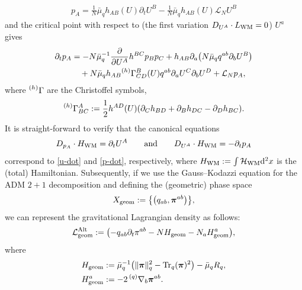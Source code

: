 \documentclass[pdftex]{sigma}
\def\ptl{\partial}%
\def\mbo#1{\boldsymbol{#1}}%
\def\grad{{\nabla}}%
\newcommand{\leftexp}[2]{{\vphantom{#2}}^{#1}{#2}}
\def\halb{\frac{1}{2}}%
\numberwithin{equation}{section}
\begin{document}
\begin{align} \label{u-dot}
p_A = \frac{1}{N} \bar{\mu}_q h_{AB} (U) \ptl_t U^B - \frac{1}{N} \bar{\mu}_q h_{AB} (U) \mathcal{L}_N U^B
\end{align}
and the critical point with respect to \big(the first variation $ D_{U^A} \cdot L_{{\rm WM}}=0$\big) $U^a$ gives
\begin{align}
\ptl_t p_A&{}= -N \bar{\mu}^{-1}_q \frac{\ptl}{\ptl U^A}h^{BC} p_B p_C + h_{AB} \ptl_a\bigl(N \bar{\mu}_q q^{ab} \ptl_b U^B\bigr) \notag\\
&\quad{}+ N\bar{\mu}_q h_{AB} \leftexp{(h)}{\Gamma}^B_{CD}(U)q^{ab}\ptl_a U^C \ptl_b U^D
 + \mathcal{L}_N p_A,\label{p-dot}
\end{align}
where $\leftexp{(h)}{\Gamma}$ are the Christoffel symbols,
\[
\leftexp{(h)}{\Gamma}^A_{BC} := \halb h^{AD}(U) (\ptl_C h_{BD} + \ptl_B h_{DC} - \ptl_D h_{BC}).
\]
It is straight-forward to verify that the canonical equations
\begin{align*}
D_{p_A}\cdot H_{{\rm WM}} = \ptl_t U^A \qquad \text{and} \qquad D_{U^A}\cdot H_{{\rm WM}} = - \ptl_t p_A
\end{align*}
correspond to \eqref{u-dot} and \eqref{p-dot}, respectively,
where $H_{{\rm WM}} := \int \mathcal{H}_{{\rm WM}} {\rm d}^2x $ is the (total) Hamiltonian. Subsequently, if we use the Gauss--Kodazzi equation for the ADM $2+1$ decomposition and defining the (geometric) phase space
\begin{align*}
X_{{\rm geom}} := \bigl\{ \bigl(q_{ab}, \mbo{\pi}^{ab}\bigr) \bigr\},
\end{align*}
 we can represent the gravitational Lagrangian density as follows:
\begin{align*}
\mathcal{L}^{{\rm Alt}}_{{\rm geom}} := \bigl(- q_{ab}\ptl_t \pi^{ab} - N H_{{\rm geom}} - N_a H_{{\rm geom}}^a\bigr),
\end{align*}
where
\begin{align*}
&H_{{\rm geom}}:= \bar{\mu}^{-1}_q \bigl(\Vert \mbo{\pi} \Vert_q^2 - {\rm Tr}_q(\mbo{\pi})^2 \bigr) - \bar{\mu}_q R_q, \\
&H_{{\rm geom}}^a := -2\, \leftexp{(q)}{\grad}_b \mbo{\pi}^{ab}.
\end{align*}
\end{document}

